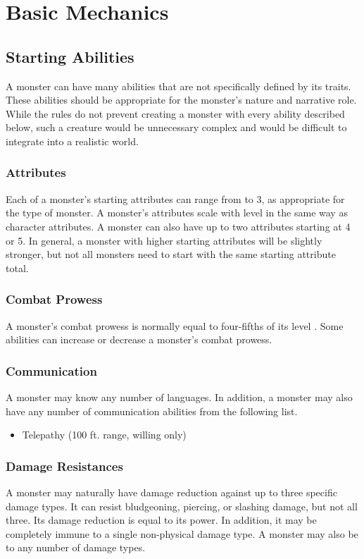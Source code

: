 \chapter{Basic Mechanics}

\section{Starting Abilities}\label{Starting Abilities}

    A monster can have many abilities that are not specifically defined by its traits.
    These abilities should be appropriate for the monster's nature and narrative role.
    While the rules do not prevent creating a monster with every ability described below, such a creature would be unnecessary complex and would be difficult to integrate into a realistic world.

    \subsection{Attributes}
        Each of a monster's starting attributes can range from  to 3, as appropriate for the type of monster.
        A monster's attributes scale with level in the same way as character attributes.
        A monster can also have up to two attributes starting at 4 or 5.
        In general, a monster with higher starting attributes will be slightly stronger, but not all monsters need to start with the same starting attribute total.

    \subsection{Combat Prowess}
        A monster's combat prowess is normally equal to four-fifths of its level .
        Some abilities can increase or decrease a monster's combat prowess.

    \subsection{Communication}
        A monster may know any number of languages.
        In addition, a monster may also have any number of communication abilities from the following list.
        \begin{itemize}
            \item Telepathy (100 ft. range, willing only)
        \end{itemize}

    \subsection{Damage Resistances}
        A monster may naturally have damage reduction against up to three specific damage types.
        It can resist bludgeoning, piercing, or slashing damage, but not all three.
        Its damage reduction is equal to its power.
        In addition, it may be completely immune to a single non-physical damage type.
        A monster may also be  to any number of damage types.

